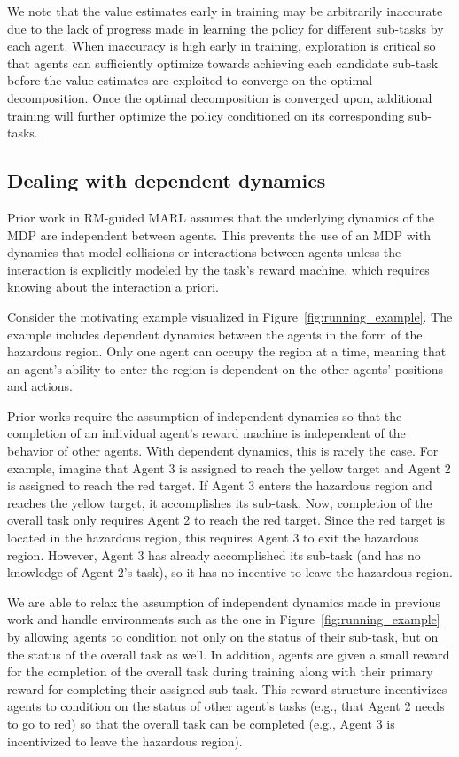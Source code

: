 We note that the value estimates early in training may be arbitrarily inaccurate due to the lack of progress made in learning the policy for different sub-tasks by each agent. When inaccuracy is high early in training, exploration is critical so that agents can sufficiently optimize towards achieving each candidate sub-task before the value estimates are exploited to converge on the optimal decomposition. Once the optimal decomposition is converged upon, additional training will further optimize the policy conditioned on its corresponding sub-tasks. 




\subsection{Dealing with dependent dynamics} \label{sec:indep_dyn}
Prior work in RM-guided MARL \cite{neary2020reward, smith2023automatic} assumes that the underlying dynamics of the MDP are independent between agents. This prevents the use of an MDP with dynamics that model collisions or interactions between agents unless the interaction is explicitly modeled by the task's reward machine, which requires knowing about the interaction a priori. 

Consider the motivating example visualized in Figure~\ref{fig:running_example}. The example includes dependent dynamics between the agents in the form of the hazardous region. Only one agent can occupy the region at a time, meaning that an agent's ability to enter the region is dependent on the other agents' positions and actions.



Prior works \cite{neary2020reward, smith2023automatic} require the assumption of independent dynamics so that the completion of an individual agent's reward machine is independent of the behavior of other agents. With dependent dynamics, this is rarely the case. For example, imagine that Agent 3 is assigned to reach the yellow target and Agent 2 is assigned to reach the red target. If Agent 3 enters the hazardous region and reaches the yellow target, it accomplishes its sub-task. Now, completion of the overall task only requires Agent 2 to reach the red target. Since the red target is located in the hazardous region, this requires Agent 3 to exit the hazardous region. However, Agent 3 has already accomplished its sub-task (and has no knowledge of Agent 2's task), so it has no incentive to leave the hazardous region.

We are able to relax the assumption of independent dynamics made in previous work \cite{neary2020reward, smith2023automatic} and handle environments such as the one in Figure~\ref{fig:running_example} by allowing agents to condition not only on the status of their sub-task, but on the status of the overall task as well. In addition, agents are given a small reward for the completion of the overall task during training along with their primary reward for completing their assigned sub-task. This reward structure incentivizes agents to condition on the status of other agent's tasks (e.g., that Agent 2 needs to go to red) so that the overall task can be completed (e.g., Agent 3 is incentivized to leave the hazardous region). 


